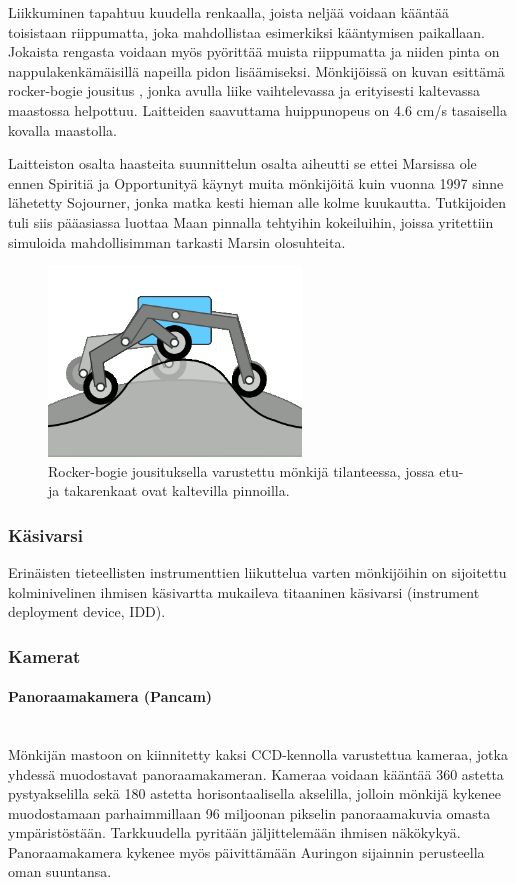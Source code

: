 \documentclass[finnish]{tktltiki2}
\theoremstyle{definition}
\theoremstyle{remark}
\begin{document}
Liikkuminen tapahtuu kuudella renkaalla, joista neljää voidaan kääntää toisistaan riippumatta, joka mahdollistaa esimerkiksi kääntymisen paikallaan. Jokaista rengasta voidaan myös pyörittää muista riippumatta ja niiden pinta on nappulakenkämäisillä napeilla pidon lisäämiseksi. Mönkijöissä on kuvan esittämä rocker-bogie jousitus \cite{harrington2004challenges}, jonka avulla liike vaihtelevassa ja erityisesti kaltevassa maastossa helpottuu. Laitteiden saavuttama huippunopeus on 4.6 cm/s tasaisella kovalla maastolla.

Laitteiston osalta haasteita suunnittelun osalta aiheutti se ettei Marsissa ole ennen Spiritiä ja Opportunityä käynyt muita mönkijöitä kuin vuonna 1997 sinne lähetetty Sojourner, jonka matka kesti hieman alle kolme kuukautta. Tutkijoiden tuli siis pääasiassa luottaa Maan pinnalla tehtyihin kokeiluihin, joissa yritettiin simuloida mahdollisimman tarkasti Marsin olosuhteita. \cite{lindemann2006mars}

\begin{figure}[H]
	\caption{Rocker-bogie jousituksella varustettu mönkijä tilanteessa, jossa etu- ja takarenkaat ovat kaltevilla pinnoilla.}
	\centering
		\includegraphics[width=0.6\textwidth]{rbogie}
\end{figure}

\subsubsection{Käsivarsi}
Erinäisten tieteellisten instrumenttien liikuttelua varten mönkijöihin on sijoitettu kolminivelinen ihmisen käsivartta mukaileva titaaninen käsivarsi (instrument deployment device, IDD).\cite{roverarm}

\subsubsection{Kamerat}
\paragraph{Panoraamakamera (Pancam)}\mbox{} \\
Mönkijän mastoon on kiinnitetty kaksi CCD-kennolla varustettua kameraa, jotka yhdessä muodostavat panoraamakameran. Kameraa voidaan kääntää 360 astetta pystyakselilla sekä 180 astetta horisontaalisella akselilla, jolloin mönkijä kykenee muodostamaan parhaimmillaan 96 miljoonan pikselin panoraamakuvia omasta ympäristöstään. Tarkkuudella pyritään jäljittelemään ihmisen näkökykyä. Panoraamakamera kykenee myös päivittämään Auringon sijainnin perusteella oman suuntansa.\cite{cams}
\end{document}
